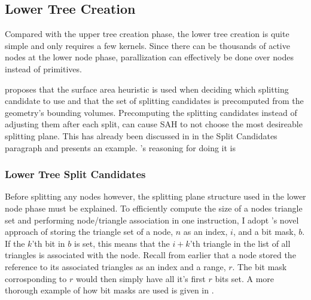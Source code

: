 \subsection{Lower Tree Creation}\label{sec:lowerNodes}

Compared with the upper tree creation phase, the lower tree creation
is quite simple and only requires a few kernels. Since there can be
thousands of active nodes at the lower node phase, parallization can
effectively be done over nodes instead of primitives.

\zhou{} proposes that the surface area heuristic is used when deciding
which splitting candidate to use and that the set of splitting
candidates is precomputed from the geometry's bounding
volumes. Precomputing the splitting candidates instead of adjusting
them after each split, can cause SAH to not choose the most desireable
splitting plane. This has already been discussed in
 in the Split Candidates paragraph and
 presents an example. \zhou's reasoning for
doing it is



\subsubsection{Lower Tree Split Candidates}


Before splitting any nodes however, the splitting plane structure used
in the lower node phase must be explained. To efficiently compute the
size of a nodes triangle set and performing node/triangle association
in one instruction, I adopt \zhou's novel approach of storing the
triangle set of a node, $n$ as an index, $i$, and a bit mask, $b$. If
the $k$'th bit in $b$ is set, this means that the $i+k$'th triangle in
the list of all triangles is associated with the node. Recall from
earlier that a node stored the reference to its associated triangles
as an index and a range, $r$. The bit mask corrosponding to $r$ would
then simply have all it's first $r$ bits set. A more thorough example
of how bit masks are used is given in .

